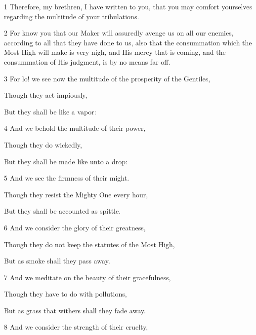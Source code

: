 \par 1 Therefore, my brethren, I have written to you, that you may comfort yourselves regarding the multitude of your tribulations. 

\par 2 For know you that our Maker will assuredly avenge us on all our enemies, according to all that they have done to us, also that the consummation which the Most High will make is very nigh, and His mercy that is coming, and the consummation of His judgment, is by no means far off.

\par 3 For lo! we see now the multitude of the prosperity of the Gentiles,

\par Though they act impiously,

\par But they shall be like a vapor:

\par 4 And we behold the multitude of their power,

\par Though they do wickedly,

\par But they shall be made like unto a drop:

\par 5 And we see the firmness of their might.

\par Though they resist the Mighty One every hour,

\par But they shall be accounted as spittle.

\par 6 And we consider the glory of their greatness,

\par Though they do not keep the statutes of the Most High,

\par But as smoke shall they pass away.

\par 7 And we meditate on the beauty of their gracefulness,

\par Though they have to do with pollutions,

\par But as grass that withers shall they fade away.

\par 8 And we consider the strength of their cruelty,

